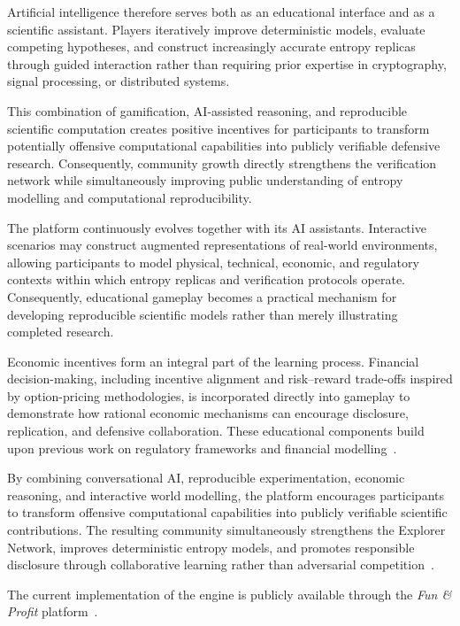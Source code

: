 \documentclass[11pt]{article}
\begin{document}
Artificial intelligence therefore serves both as an educational
interface and as a scientific assistant.
Players iteratively improve deterministic models,
evaluate competing hypotheses,
and construct increasingly accurate entropy replicas through guided
interaction rather than requiring prior expertise in cryptography,
signal processing,
or distributed systems.

This combination of gamification,
AI-assisted reasoning,
and reproducible scientific computation creates positive incentives for
participants to transform potentially offensive computational
capabilities into publicly verifiable defensive research.
Consequently,
community growth directly strengthens the verification network while
simultaneously improving public understanding of entropy modelling and
computational reproducibility.

The platform continuously evolves together with its AI assistants.
Interactive scenarios may construct augmented representations of
real-world environments, allowing participants to model physical,
technical, economic, and regulatory contexts within which entropy
replicas and verification protocols operate.
Consequently, educational gameplay becomes a practical mechanism for
developing reproducible scientific models rather than merely
illustrating completed research.

Economic incentives form an integral part of the learning process.
Financial decision-making, including incentive alignment and
risk--reward trade-offs inspired by option-pricing methodologies,
is incorporated directly into gameplay to demonstrate how rational
economic mechanisms can encourage disclosure, replication, and
defensive collaboration.
These educational components build upon previous work on regulatory
frameworks and financial modelling~\cite{Kondratiuk2021}.

By combining conversational AI, reproducible experimentation,
economic reasoning, and interactive world modelling, the platform
encourages participants to transform offensive computational
capabilities into publicly verifiable scientific contributions.
The resulting community simultaneously strengthens the Explorer
Network, improves deterministic entropy models, and promotes
responsible disclosure through collaborative learning rather than
adversarial competition~\cite{funAndProfit2026}.

The current implementation of the engine is publicly available through the
\emph{Fun \& Profit} platform~\cite{funAndProfit2026}.
\end{document}
